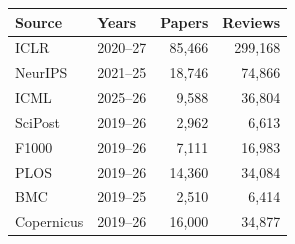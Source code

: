 \begin{tabular}{llrr}
\toprule
Source & Years & Papers & Reviews \\
\midrule
ICLR & 2020--27 & 85,466 & 299,168 \\
NeurIPS & 2021--25 & 18,746 & 74,866 \\
ICML & 2025--26 & 9,588 & 36,804 \\
SciPost & 2019--26 & 2,962 & 6,613 \\
F1000 & 2019--26 & 7,111 & 16,983 \\
PLOS & 2019--26 & 14,360 & 34,084 \\
BMC & 2019--25 & 2,510 & 6,414 \\
Copernicus & 2019--26 & 16,000 & 34,877 \\
\bottomrule
\end{tabular}
